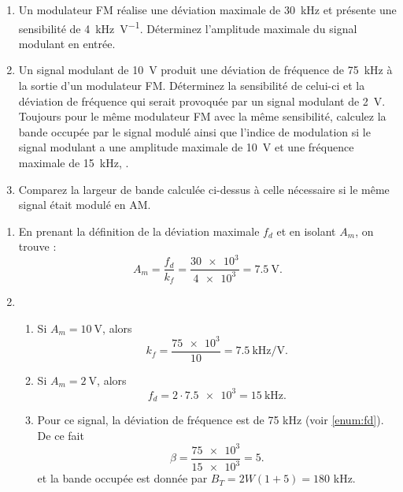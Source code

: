 \documentclass [a4paper, 11pt] {article}
\begin{document}
    \begin{exercice}[Modulation FM]{2}
    
        \begin{enumerate}
            \item Un modulateur FM réalise une déviation maximale de \SI{30}{\kilo\hertz} et présente une sensibilité de \SI{4}{\kilo\hertz\per\volt}. Déterminez l'amplitude maximale du signal modulant en entrée.
            \item Un signal modulant de \SI{10}{\volt} produit une déviation de fréquence de \SI{75}{\kilo\hertz} à la sortie d'un modulateur FM. Déterminez la sensibilité de celui-ci et la déviation de fréquence qui serait provoquée par un signal modulant de \SI{2}{\volt}. Toujours pour le même modulateur FM avec la même sensibilité, calculez la bande occupée par le signal modulé ainsi que l'indice de modulation si le signal modulant a une amplitude maximale de \SI{10}{\volt} et une fréquence maximale de \SI{15}{\kilo\hertz}, .
            \item Comparez la largeur de bande calculée ci-dessus à celle nécessaire si le même signal était modulé en AM.
        \end{enumerate}
        
    \end{exercice}
    
    \begin{reponse}
        \begin{enumerate}
            \item En prenant la définition de la déviation maximale $f_d$ et en isolant $A_m$, on trouve :
            \begin{equation}
                A_m = \frac{f_d}{k_f} = \frac{\num{30e3}}{\num{4e3}} = \SI{7.5}{\volt}.
            \end{equation}
        \item \begin{enumerate}
                \item \label{enum:fd}
                Si $A_m=\SI{10}{\volt}$, alors
                \begin{equation}
                    k_f = \frac{\num{75e3}}{10} = \SI{7.5}{\kilo\hertz\per\volt}.
                \end{equation}
                \item Si $A_m=\SI{2}{\volt}$, alors
                \begin{equation}
                    f_d = 2 \cdot \num{7.5e3} = \SI{15}{\kilo\hertz}.
                \end{equation}
                \item Pour ce signal, la déviation de fréquence est de 75 kHz (voir \ref{enum:fd}). De ce fait
                \begin{equation}
                    \beta = \frac{\num{75e3}}{\num{15e3}}=5.
                \end{equation}
                et la bande occupée est donnée par $B_T=2W (1+5) = 180$ kHz.
            \end{enumerate}
        \end{enumerate}
    \end{reponse}
    
\end{document}
